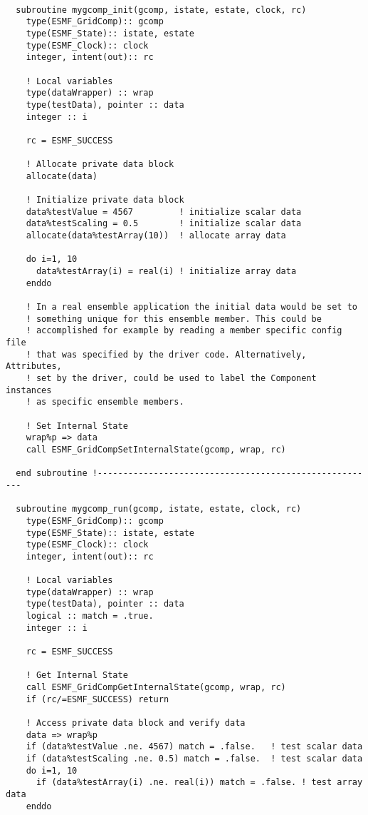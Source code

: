  \begin{verbatim}

  subroutine mygcomp_init(gcomp, istate, estate, clock, rc)
    type(ESMF_GridComp):: gcomp
    type(ESMF_State):: istate, estate
    type(ESMF_Clock):: clock
    integer, intent(out):: rc

    ! Local variables
    type(dataWrapper) :: wrap
    type(testData), pointer :: data
    integer :: i

    rc = ESMF_SUCCESS
    
    ! Allocate private data block
    allocate(data)

    ! Initialize private data block
    data%testValue = 4567         ! initialize scalar data
    data%testScaling = 0.5        ! initialize scalar data
    allocate(data%testArray(10))  ! allocate array data
    
    do i=1, 10
      data%testArray(i) = real(i) ! initialize array data
    enddo
    
    ! In a real ensemble application the initial data would be set to 
    ! something unique for this ensemble member. This could be 
    ! accomplished for example by reading a member specific config file 
    ! that was specified by the driver code. Alternatively, Attributes, 
    ! set by the driver, could be used to label the Component instances 
    ! as specific ensemble members.
    
    ! Set Internal State
    wrap%p => data
    call ESMF_GridCompSetInternalState(gcomp, wrap, rc)

  end subroutine !-------------------------------------------------------
  
  subroutine mygcomp_run(gcomp, istate, estate, clock, rc)
    type(ESMF_GridComp):: gcomp
    type(ESMF_State):: istate, estate
    type(ESMF_Clock):: clock
    integer, intent(out):: rc

    ! Local variables
    type(dataWrapper) :: wrap
    type(testData), pointer :: data
    logical :: match = .true.
    integer :: i
    
    rc = ESMF_SUCCESS

    ! Get Internal State
    call ESMF_GridCompGetInternalState(gcomp, wrap, rc)
    if (rc/=ESMF_SUCCESS) return

    ! Access private data block and verify data
    data => wrap%p 
    if (data%testValue .ne. 4567) match = .false.   ! test scalar data
    if (data%testScaling .ne. 0.5) match = .false.  ! test scalar data
    do i=1, 10
      if (data%testArray(i) .ne. real(i)) match = .false. ! test array data
    enddo
    

\end{verbatim}
